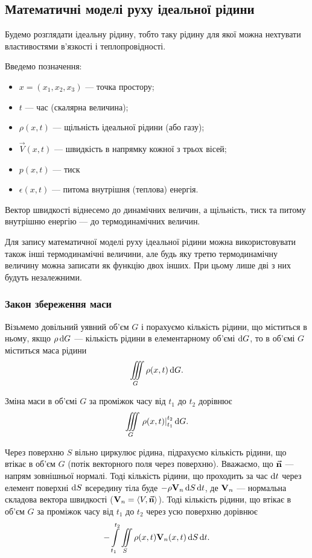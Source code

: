 \subsection{Математичні моделі руху ідеальної рідини}

Будемо розглядати ідеальну рідину, тобто таку рідину для якої можна нехтувати властивостями в'язкості і теплопровідності. \medskip

Введемо позначення:
\begin{itemize}
	\item $x = (x_1, x_2, x_3)$ --- точка простору;
	\item $t$ --- час (скалярна величина);
	\item $\rho(x, t)$ --- щільність ідеальної рідини (або газу);
	\item $\vec V(x, t)$ --- швидкість в напрямку кожної з трьох вісей;
	\item $p(x, t)$ --- тиск 
	\item $\epsilon(x, t)$ --- питома внутрішня (теплова) енергія.
\end{itemize}

Вектор швидкості віднесемо до динамічних величин, а щільність, тиск та питому внутрішню енергію --- до термодинамічних величин. \medskip

Для запису математичної моделі руху ідеальної рідини можна використовувати також інші термодинамічні величини, але будь яку третю термодинамічну величину можна записати як функцію двох інших. При цьому лише дві з них будуть незалежними. 

\subsubsection{Закон збереження маси}

Візьмемо довільний уявний об'єм $G$ і порахуємо кількість рідини, що міститься в ньому, якщо $\rho \diff G$ --- кількість рідини в елементарному об'ємі $\diff G$, то в об'ємі $G$ міститься маса рідини
\begin{equation}
	\Iiint_G \rho(x, t) \diff G.
\end{equation}

Зміна маси в об'ємі $G$ за проміжок часу від $t_1$ до $t_2$ дорівнює 
\begin{equation}
	\Iiint_G \left. \rho(x, t) \right|_{t_1}^{t_2} \diff G.
\end{equation}

Через поверхню $S$ вільно циркулює рідина, підрахуємо кількість рідини, що втікає в об'єм $G$ (потік векторного поля через поверхню). Вважаємо, що $\vec{\bf{n}}$ --- напрям зовнішньої нормалі. Тоді кількість рідини, що проходить за час $\diff t$ через елемент поверхні $\diff S$ всередину тіла буде $- \rho \bf{V}_n \diff S \diff t$, де $\bf{V}_n$ --- нормальна складова вектора швидкості ($\bf{V}_n = \langle V, \vec{\bf{n}} \rangle$). Тоді кількість рідини, що втікає в об'єм $G$ за проміжок часу від $t_1$ до $t_2$ через усю поверхню дорівнює
\begin{equation}
	-\Int_{t_1}^{t_2} \Iint_S \rho(x, t) \bf{V}_n(x, t) \diff S \diff t.
\end{equation}

